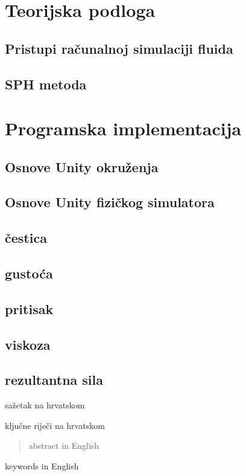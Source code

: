 \documentclass[diplomskirad]{fer}
\begin{document}
    \chapter{Teorijska podloga}\label{ch:teorijska-podloga}

    \section{Pristupi računalnoj simulaciji fluida}\label{sec:pristupi-racunalnoj-simulaciji-fluida}

    \section{SPH metoda}\label{sec:sph-metoda}


    \chapter{Programska implementacija}\label{ch:programska-implementacija}

    \section{Osnove Unity okruženja}\label{sec:osnove-unity-okruzenja}
    \section{Osnove Unity fizičkog simulatora}\label{sec:osnove-unity-fizickog-simulatora}
    \section{čestica}\label{sec:cestica}
    \section{gustoća}\label{sec:gustoca}
    \section{pritisak}\label{sec:pritisak}
    \section{viskoza}\label{sec:viskoza}
    \section{rezultantna sila}\label{sec:rezultantna-sila}


    
    \begin{sazetak}
        sažetak na hrvatskom
    \end{sazetak}
    \begin{kljucnerijeci}
        ključne riječi na hrvatskom
    \end{kljucnerijeci}
    \begin{abstract}
        abstract in English
    \end{abstract}
    \begin{keywords}
        keywords in English
    \end{keywords}
\end{document}
